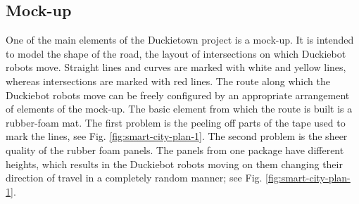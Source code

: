 \documentclass[conference]{IEEEtran}
\begin{document}
\subsection{Mock-up}\label{subsec:plane}
One of the main elements of the Duckietown project is a mock-up. It is intended to model the shape of the road, the layout of intersections on which Duckiebot robots move. Straight lines and curves are marked with white and yellow lines, whereas intersections are marked with red lines. The route along which the Duckiebot robots move can be freely configured by an appropriate arrangement of elements of the mock-up. The basic element from which the route is built is a rubber-foam mat. The first problem is the peeling off parts of the tape used to mark the lines, see Fig. \ref{fig:smart-city-plan-1}. The second problem is the sheer quality of the rubber foam panels. The panels from one package have different heights, which results in the Duckiebot robots moving on them changing their direction of travel in a completely random manner; see Fig. \ref{fig:smart-city-plan-1}.
\end{document}
